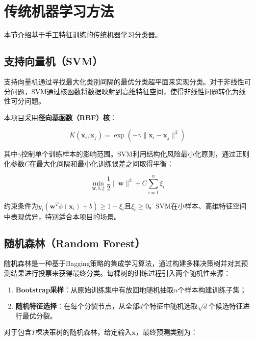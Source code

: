 \documentclass[UTF8,a4paper,12pt]{ctexart}
\numberwithin{figure}{section}
\numberwithin{table}{section}
\begin{document}
\section{传统机器学习方法}\label{sec:ml}

本节介绍基于手工特征训练的传统机器学习分类器。

\subsection{支持向量机（SVM）}

支持向量机通过寻找最大化类别间隔的最优分类超平面来实现分类。对于非线性可分问题，SVM通过核函数将数据映射到高维特征空间，使得非线性问题转化为线性可分问题。

本项目采用\textbf{径向基函数（RBF）核}：

\begin{equation}
K(\mathbf{x}_i, \mathbf{x}_j) = \exp\left(-\gamma \|\mathbf{x}_i - \mathbf{x}_j\|^2\right)
\end{equation}

其中$\gamma$控制单个训练样本的影响范围。SVM利用结构化风险最小化原则，通过正则化参数$C$在最大化间隔和最小化训练误差之间取得平衡：

\begin{equation}
\min_{\mathbf{w}, b, \xi} \frac{1}{2}\|\mathbf{w}\|^2 + C\sum_{i=1}^{n}\xi_i
\end{equation}

约束条件为$y_i(\mathbf{w}^T\phi(\mathbf{x}_i) + b) \geq 1 - \xi_i$且$\xi_i \geq 0$。SVM在小样本、高维特征空间中表现优异，特别适合本项目的场景。

\subsection{随机森林（Random Forest）}

随机森林是一种基于Bagging策略的集成学习算法，通过构建多棵决策树并对其预测结果进行投票来获得最终分类。每棵树的训练过程引入两个随机性来源：

\begin{enumerate}
    \item \textbf{Bootstrap采样}：从原始训练集中有放回地随机抽取$n$个样本构建训练子集；
    \item \textbf{随机特征选择}：在每个分裂节点，从全部$d$个特征中随机选取$\sqrt{d}$个候选特征进行最优分裂。
\end{enumerate}

对于包含$T$棵决策树的随机森林，给定输入$\mathbf{x}$，最终预测类别为：
\end{document}
